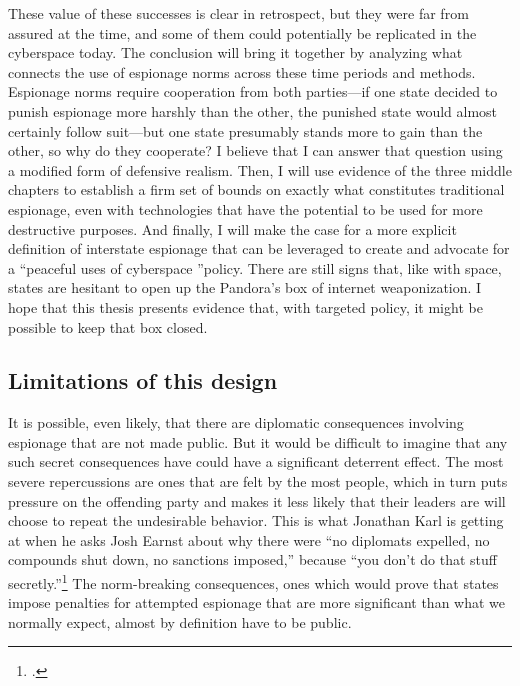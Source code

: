 \documentclass{memoir}
\begin{document}
\begin{refsegment}
These value of these successes is clear in retrospect, but they were far from assured at the time, and some of them could potentially be replicated in the cyberspace today. The conclusion will bring it together by analyzing what connects the use of espionage norms across these time periods and methods. Espionage norms require cooperation from both parties---if one state decided to punish espionage more harshly than the other, the punished state would almost certainly follow suit---but one state presumably stands more to gain than the other, so why do they cooperate? I believe that I can answer that question using a modified form of defensive realism. Then, I will use evidence of the three middle chapters to establish a firm set of bounds on exactly what constitutes traditional espionage, even with technologies that have the potential to be used for more destructive purposes. And finally, I will make the case for a more explicit definition of interstate espionage that can be leveraged to create and advocate for a ``peaceful uses of cyberspace ''policy. There are still signs that, like with space, states are hesitant to open up the Pandora's box of internet weaponization. I hope that this thesis presents evidence that, with targeted policy, it might be possible to keep that box closed.

\subsection{Limitations of this design}
It is possible, even likely, that there are diplomatic consequences involving espionage that are not made public. But it would be difficult to imagine that any such secret consequences have could have a significant deterrent effect.  The most severe repercussions are ones that are felt by the most people, which in turn puts pressure on the offending party and makes it less likely that their leaders are will choose to repeat the undesirable behavior. This is what Jonathan Karl is getting at when he asks Josh Earnst about why there were ``no diplomats expelled, no compounds shut down, no sanctions imposed,'' because ``you don't do that stuff secretly.''\footcite{earnest_press_2017} The norm-breaking consequences, ones which would prove that states impose penalties for attempted espionage that are more significant than what we normally expect, almost by definition have to be public.


\end{refsegment}
\end{document}
